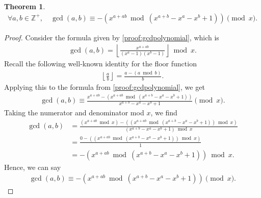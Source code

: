 \documentclass[11pt,reqno]{article}
\theoremstyle{plain}
\newtheorem{theorem}{Theorem}
\theoremstyle{definition}
\newcommand{\floor}[1]{\left\lfloor #1 \right\rfloor}
\newcommand{\Z}{\mathbb{Z}}
\begin{document}
\begin{theorem} \label{proof:gcdmodmodpoly}
\begin{align*}
\forall a,b \in \Z^+, \quad
\gcd(a,b) \equiv - \left( x^{a+ab} \bmod(x^{a+b}-x^a-x^b+1) \right) \pmod{x}.
\end{align*}
\end{theorem}
\begin{proof}
Consider the formula given by \cref{proof:gcdpolynomial}, which is
\begin{align*}
    \gcd(a,b) = \floor{\frac{x^{a+ab}}{(x^a-1)(x^b-1)}}\bmod x .
\end{align*}
Recall the following well-known identity for the floor function
\begin{align*}
    \floor{\frac{a}{b}} = \frac{a - (a \bmod b)}{b} .
\end{align*}
Applying this to the formula from \cref{proof:gcdpolynomial}, we get
\begin{align*}
    \gcd(a,b) \equiv \frac{x^{a+ab} - \left( x^{a+ab} \bmod(x^{a+b}-x^a-x^b+1) \right)}
    {x^{a+b}-x^a-x^b+1}
    \pmod x .
\end{align*}
Taking the numerator and denominator mod $x$, we find
\begin{align*}
    \gcd(a,b) &= \frac{(x^{a+ab} \bmod x) - \left(\left( x^{a+ab} \bmod(x^{a+b}-x^a-x^b+1) \right) \bmod x \right)}
    {(x^{a+b}-x^a-x^b+1) \bmod x} \\
    &=
    \frac{0 - \left(\left( x^{a+ab} \bmod(x^{a+b}-x^a-x^b+1) \right) \bmod x \right)}
    {1} \\
    &=
    - \left( x^{a+ab} \bmod(x^{a+b}-x^a-x^b+1) \right) \bmod x.
\end{align*}
Hence, we can say
\begin{align*}
\gcd(a,b) \equiv - \left( x^{a+ab} \bmod(x^{a+b}-x^a-x^b+1) \right) \pmod{x} .
\end{align*}
\end{proof}
\end{document}
